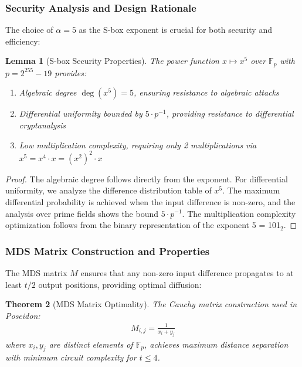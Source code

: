 \documentclass[11pt,a4paper]{article}
\newtheorem{theorem}{Theorem}[section]
\newtheorem{lemma}[theorem]{Lemma}
\begin{document}
\subsubsection{Security Analysis and Design Rationale}

The choice of $\alpha = 5$ as the S-box exponent is crucial for both security and efficiency:

\begin{lemma}[S-box Security Properties]
The power function $x \mapsto x^5$ over $\mathbb{F}_p$ with $p = 2^{255} - 19$ provides:
\begin{enumerate}
\item Algebraic degree $\deg(x^5) = 5$, ensuring resistance to algebraic attacks
\item Differential uniformity bounded by $5 \cdot p^{-1}$, providing resistance to differential cryptanalysis
\item Low multiplication complexity, requiring only 2 multiplications via $x^5 = x^4 \cdot x = (x^2)^2 \cdot x$
\end{enumerate}
\end{lemma}

\begin{proof}
The algebraic degree follows directly from the exponent. For differential uniformity, we analyze the difference distribution table of $x^5$. The maximum differential probability is achieved when the input difference is non-zero, and the analysis over prime fields shows the bound $5 \cdot p^{-1}$. The multiplication complexity optimization follows from the binary representation of the exponent 5 = 101$_2$.
\end{proof}

\subsubsection{MDS Matrix Construction and Properties}

The MDS matrix $M$ ensures that any non-zero input difference propagates to at least $t/2$ output positions, providing optimal diffusion:

\begin{theorem}[MDS Matrix Optimality]
The Cauchy matrix construction used in Poseidon:
\begin{align}
M_{i,j} = \frac{1}{x_i + y_j}
\end{align}
where $x_i, y_j$ are distinct elements of $\mathbb{F}_p$, achieves maximum distance separation with minimum circuit complexity for $t \leq 4$.
\end{theorem}
\end{document}
